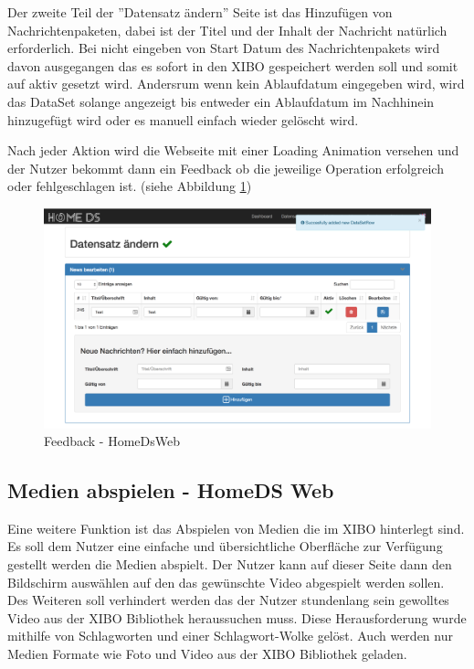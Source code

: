 Der zweite Teil der ''Datensatz ändern'' Seite ist das Hinzufügen von Nachrichtenpaketen, dabei ist der Titel und der Inhalt der Nachricht natürlich erforderlich. Bei nicht eingeben von Start Datum des Nachrichtenpakets wird davon ausgegangen das es sofort in den XIBO gespeichert werden soll und somit auf aktiv gesetzt wird. Andersrum wenn kein Ablaufdatum eingegeben wird, wird das DataSet solange angezeigt bis entweder ein Ablaufdatum im Nachhinein hinzugefügt wird oder es manuell einfach wieder gelöscht wird.

Nach jeder Aktion wird die Webseite mit einer Loading Animation versehen und der Nutzer bekommt dann ein Feedback ob die jeweilige Operation erfolgreich oder fehlgeschlagen ist. (siehe Abbildung \ref{img:feedback})

\begin{figure}[H]
\centering
\includegraphics[width=1\textwidth]{images/08_HomeDsWeb/Message.png}
\caption{Feedback - HomeDsWeb}
\label{img:feedback}
\end{figure}

\subsection{Medien abspielen - HomeDS Web}\label{sec:playmedia}
Eine weitere Funktion ist das Abspielen von Medien die im XIBO hinterlegt sind. Es soll dem Nutzer eine einfache und übersichtliche Oberfläche zur Verfügung gestellt werden die Medien abspielt. Der Nutzer kann auf dieser Seite dann den Bildschirm auswählen auf den das gewünschte Video abgespielt werden sollen. Des Weiteren soll verhindert werden das der Nutzer stundenlang sein gewolltes Video aus der XIBO Bibliothek heraussuchen muss. Diese Herausforderung wurde mithilfe von Schlagworten und einer Schlagwort-Wolke gelöst. Auch werden nur Medien Formate wie Foto und Video aus der XIBO Bibliothek geladen.

